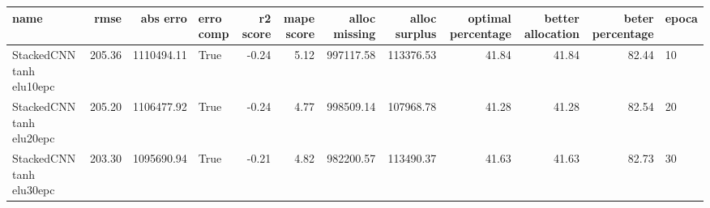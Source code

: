 \begin{tabular}{lrrlrrrrrrrl}
\toprule
name & rmse & abs erro & erro comp & r2 score & mape score & alloc missing & alloc surplus & optimal percentage & better allocation & beter percentage & epoca \\
\midrule
StackedCNN tanh elu10epc & 205.36 & 1110494.11 & True & -0.24 & 5.12 & 997117.58 & 113376.53 & 41.84 & 41.84 & 82.44 & 10 \\
StackedCNN tanh elu20epc & 205.20 & 1106477.92 & True & -0.24 & 4.77 & 998509.14 & 107968.78 & 41.28 & 41.28 & 82.54 & 20 \\
StackedCNN tanh elu30epc & 203.30 & 1095690.94 & True & -0.21 & 4.82 & 982200.57 & 113490.37 & 41.63 & 41.63 & 82.73 & 30 \\
\bottomrule
\end{tabular}
